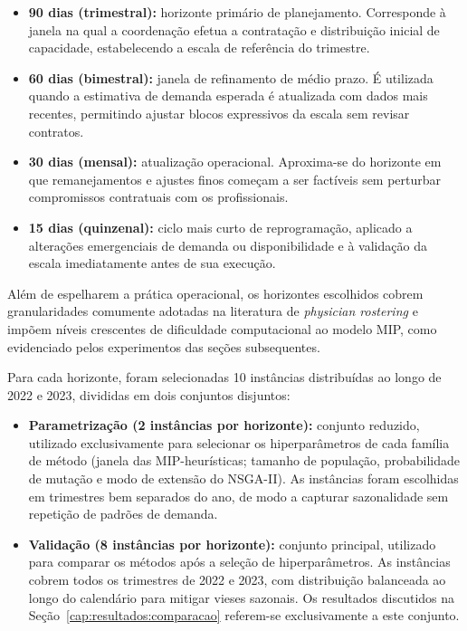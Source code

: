 \begin{itemize}
	\item \textbf{90 dias (trimestral):} horizonte primário de planejamento. Corresponde à janela na qual a coordenação efetua a contratação e distribuição inicial de capacidade, estabelecendo a escala de referência do trimestre.
	\item \textbf{60 dias (bimestral):} janela de refinamento de médio prazo. É utilizada quando a estimativa de demanda esperada é atualizada com dados mais recentes, permitindo ajustar blocos expressivos da escala sem revisar contratos.
	\item \textbf{30 dias (mensal):} atualização operacional. Aproxima-se do horizonte em que remanejamentos e ajustes finos começam a ser factíveis sem perturbar compromissos contratuais com os profissionais.
	\item \textbf{15 dias (quinzenal):} ciclo mais curto de reprogramação, aplicado a alterações emergenciais de demanda ou disponibilidade e à validação da escala imediatamente antes de sua execução.
\end{itemize}

Além de espelharem a prática operacional, os horizontes escolhidos cobrem granularidades comumente adotadas na literatura de \textit{physician rostering} e impõem níveis crescentes de dificuldade computacional ao modelo MIP, como evidenciado pelos experimentos das seções subsequentes.

Para cada horizonte, foram selecionadas 10 instâncias distribuídas ao longo de 2022 e 2023, divididas em dois conjuntos disjuntos:

\begin{itemize}
	\item \textbf{Parametrização (2 instâncias por horizonte):} conjunto reduzido, utilizado exclusivamente para selecionar os hiperparâmetros de cada família de método (janela das MIP-heurísticas; tamanho de população, probabilidade de mutação e modo de extensão do NSGA-II). As instâncias foram escolhidas em trimestres bem separados do ano, de modo a capturar sazonalidade sem repetição de padrões de demanda.
	\item \textbf{Validação (8 instâncias por horizonte):} conjunto principal, utilizado para comparar os métodos após a seleção de hiperparâmetros. As instâncias cobrem todos os trimestres de 2022 e 2023, com distribuição balanceada ao longo do calendário para mitigar vieses sazonais. Os resultados discutidos na Seção~\ref{cap:resultados:comparacao} referem-se exclusivamente a este conjunto.
\end{itemize}

